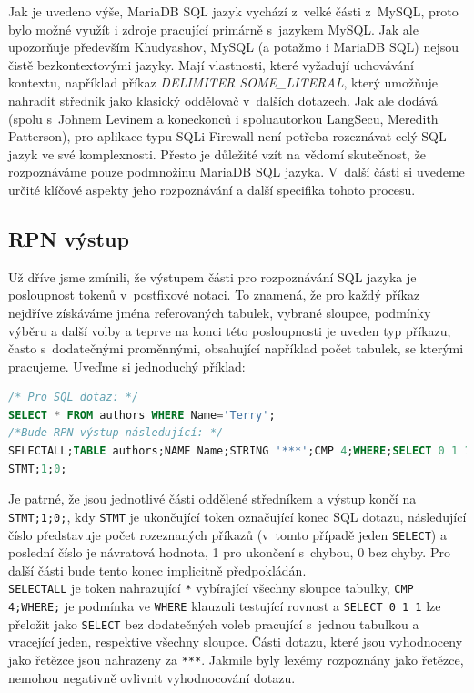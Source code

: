 Jak je uvedeno výše, MariaDB SQL jazyk vychází z~velké části z~MySQL, proto bylo možné využít i zdroje pracující primárně s~jazykem MySQL.
Jak ale upozorňuje především Khudyashov, MySQL (a potažmo i MariaDB SQL) nejsou čistě bezkontextovými jazyky. Mají vlastnosti, které vyžadují
uchovávání kontextu, například příkaz \textit{DELIMITER SOME\_LITERAL}, který umožňuje nahradit středník jako klasický oddělovač v~dalších dotazech.
Jak ale dodává (spolu s~Johnem Levinem a koneckonců i spoluautorkou LangSecu, Meredith Patterson), pro aplikace typu SQLi Firewall není potřeba rozeznávat celý
SQL jazyk ve své komplexnosti. Přesto je důležité vzít na vědomí skutečnost, že rozpoznáváme pouze podmnožinu MariaDB SQL jazyka. 
V~další části si uvedeme určité klíčové aspekty jeho rozpoznávání a další specifika tohoto procesu. 

\subsection{RPN výstup} \label{subsec:6:rpn}
Už dříve jsme zmínili, že výstupem části pro rozpoznávání SQL jazyka je posloupnost tokenů v~postfixové notaci. To znamená, že pro každý
příkaz nejdříve získáváme jména referovaných tabulek, vybrané sloupce, podmínky výběru a další volby a teprve na konci této 
posloupnosti je uveden typ příkazu, často s~dodatečnými proměnnými, obsahující například počet tabulek, se kterými pracujeme.
Uveďme si jednoduchý příklad:

\begin{lstlisting}[language=sql]
/* Pro SQL dotaz: */
SELECT * FROM authors WHERE Name='Terry';
/*Bude RPN výstup následující: */
SELECTALL;TABLE authors;NAME Name;STRING '***';CMP 4;WHERE;SELECT 0 1 1;
STMT;1;0;
\end{lstlisting}

Je patrné, že jsou jednotlivé části oddělené středníkem a výstup končí na \texttt{STMT;1;0;}, kdy \texttt{STMT} je ukončující token
označující konec SQL dotazu, následující číslo představuje počet rozeznaných příkazů (v~tomto případě jeden \texttt{SELECT}) a
poslední číslo je návratová hodnota, 1 pro ukončení s~chybou, 0 bez chyby. Pro další části bude tento konec implicitně předpokládán. \\

\texttt{SELECTALL} je token nahrazující \texttt{*} vybírající všechny sloupce tabulky, \texttt{CMP 4;WHERE;} je podmínka ve \texttt{WHERE} klauzuli
testující rovnost a \texttt{SELECT 0 1 1} lze přeložit jako \texttt{SELECT} bez dodatečných voleb pracující s~jednou tabulkou a vracející jeden, respektive
všechny sloupce. Části dotazu, které jsou vyhodnoceny jako řetězce jsou nahrazeny za \texttt{***}. Jakmile byly lexémy rozpoznány jako řetězce,
nemohou negativně ovlivnit vyhodnocování dotazu.

